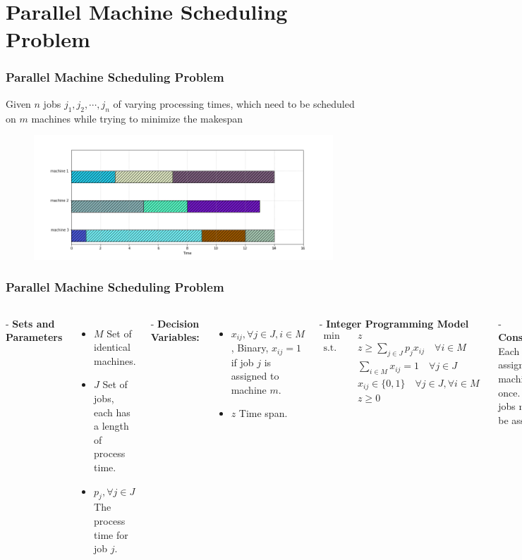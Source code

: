 \documentclass[10pt]{beamer}
\begin{document}
	\section{Parallel Machine Scheduling Problem}
		\begin{frame}
			\frametitle{Parallel Machine Scheduling Problem}
			Given $n$ jobs $j_1, j_2, \cdots, j_n$ of varying processing times, which need to be scheduled on $m$ machines while trying to minimize the makespan
			\begin{figure}[!h]
				\centering
				\includegraphics[width=1\textwidth]{PMS}
			\end{figure}
		\end{frame}
		\begin{frame}
			\frametitle{Parallel Machine Scheduling Problem}
			\begin{columns}[c]
				\column{0.4\textwidth}
				- \textbf{Sets and Parameters}
				\begin{itemize}
					\item $M$ Set of identical machines.
					\item $J$ Set of jobs, each has a length of process time.
					\item $p_j, \forall j \in J$ The process time for job $j$.
				\end{itemize}				
				- \textbf{Decision Variables:}
				\begin{itemize}
					\item $x_{ij}, \forall j \in J, i \in M$, Binary, $x_{ij} = 1$ if job $j$ is assigned to machine $m$.
					\item $z$ Time span.
				\end{itemize}

				\column{0.6\textwidth}
				- \textbf{Integer Programming Model}
				\begin{align}
					\min \quad & z \label{pms:obj}\\
					\text{s.t.} \quad & z \ge \sum_{j \in J} p_j x_{ij} \quad \forall i \in M\\
					& \sum_{i \in M} x_{ij} = 1 \quad \forall j \in J\\
					& x_{ij} \in \{0, 1\} \quad \forall j \in J, \forall i \in M\\
					& z \ge 0
				\end{align}

				- \textbf{Constraints}
				Each job can assign to one machine once. All jobs needs to be assigned.
			\end{columns}
		\end{frame}
\end{document}
